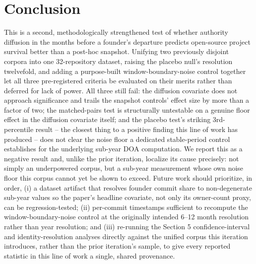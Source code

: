 \documentclass[11pt,letterpaper]{article}
\begin{document}
\section{Conclusion}

This is a second, methodologically strengthened test of whether authority diffusion in the months before a founder's departure predicts open-source project survival better than a post-hoc snapshot. Unifying two previously disjoint corpora into one 32-repository dataset, raising the placebo null's resolution twelvefold, and adding a purpose-built window-boundary-noise control together let all three pre-registered criteria be evaluated on their merits rather than deferred for lack of power. All three still fail: the diffusion covariate does not approach significance and trails the snapshot controls' effect size by more than a factor of two; the matched-pairs test is structurally untestable on a genuine floor effect in the diffusion covariate itself; and the placebo test's striking 3rd-percentile result -- the closest thing to a positive finding this line of work has produced -- does not clear the noise floor a dedicated stable-period control establishes for the underlying sub-year DOA computation. We report this as a negative result and, unlike the prior iteration, localize its cause precisely: not simply an underpowered corpus, but a sub-year measurement whose own noise floor this corpus cannot yet be shown to exceed. Future work should prioritize, in order, (i) a dataset artifact that resolves founder commit share to non-degenerate sub-year values so the paper's headline covariate, not only its owner-count proxy, can be regression-tested; (ii) per-commit timestamps sufficient to recompute the window-boundary-noise control at the originally intended 6--12 month resolution rather than year resolution; and (iii) re-running the Section 5 confidence-interval and identity-resolution analyses directly against the unified corpus this iteration introduces, rather than the prior iteration's sample, to give every reported statistic in this line of work a single, shared provenance.



\end{document}
